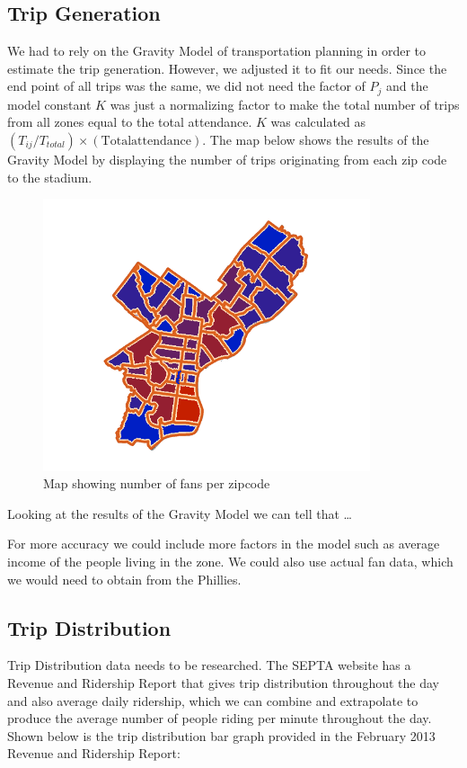 
\subsection{Trip Generation}

We had to rely on the Gravity Model of transportation planning in order to estimate the trip generation. However, we adjusted it to fit our needs. Since the end point of all trips was the same, we did not need the factor of $P_j$ and the model constant $K$ was just a normalizing factor to make the total number of trips from all zones equal to the total attendance. $K$ was calculated as $(T_{ij}/T_{total}) \times (\mathrm{Total attendance})$. The map below shows the results of the Gravity Model by displaying the number of trips originating from each zip code to the stadium.

\begin{figure}[htp]
  \centering
  \includegraphics[height=8cm]{graphics/trip-generation.png}
  \caption{Map showing number of fans per zipcode}
  \label{fig-trip-generation-results}
\end{figure}

Looking at the results of the Gravity Model we can tell that …

For more accuracy we could include more factors in the model such as  average income of the people living in the zone. We could also use actual fan data, which we would need to obtain from the Phillies.


\subsection{Trip Distribution}

Trip Distribution data needs to be researched. The SEPTA website has a Revenue and Ridership Report that gives trip distribution throughout the day and also average daily ridership, which we can combine and extrapolate to produce the average number of people riding per minute throughout the day. Shown below is the trip distribution bar graph provided in the February 2013 Revenue and Ridership Report:

